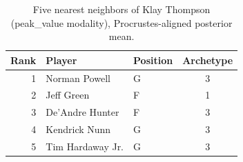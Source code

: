 \begin{table}[htbp]
  \centering\small
  \begin{tabular}{rllc}
    \toprule
    Rank & Player & Position & Archetype \\
    \midrule
    1 & Norman Powell & G & 3 \\
    2 & Jeff Green & F & 1 \\
    3 & De'Andre Hunter & F & 3 \\
    4 & Kendrick Nunn & G & 3 \\
    5 & Tim Hardaway Jr. & G & 3 \\
    \bottomrule
  \end{tabular}
  \caption{Five nearest neighbors of Klay Thompson (peak_value modality), Procrustes-aligned posterior mean.}
  \label{tab:Klay_Thompson_neighbors_peak_value}
\end{table}

